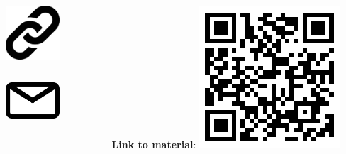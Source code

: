 \begin{columns}[c]
	
	\begin{column}[t]{0.7\textwidth}

		\begin{columns}[c]
			\begin{column}{0.1\textwidth}
				\includegraphics[width=2cm]{icons/url.pdf}
			\end{column}
			\begin{column}{0.9\textwidth}
				\large{
					\color{boxbkseablue}
					
					\textbf{\getUrlList}
				}
			\end{column}
		\end{columns}
		\vskip1cm
		\begin{columns}[c]
			\begin{column}{0.1\textwidth}

				\includegraphics[width=2cm]{icons/mail.pdf}
			\end{column}
			
			\begin{column}{0.9\textwidth}
				\hskip-0.3cm
				\large{ 
					\color{boxbkseablue}
					\textbf{\getContactsList}
				}
			\end{column}
		
		\end{columns}

	\end{column}
	
	\begin{column}[t]{.2\textwidth}
		\centering
		\vskip0.5cm
		\Large{\textbf{Link to material}:} \vskip0.5cm
		\includegraphics[scale=1.5]{docs/imgs/humanoids_paper.pdf}
	\end{column}
	
\end{columns}
\vskip1.5cm